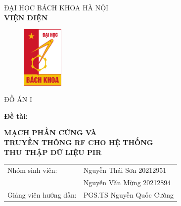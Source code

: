 \documentclass{article}
\begin{document}
\begin{titlepage}

\begin{center}
    \vspace{-10pt} ĐẠI HỌC BÁCH KHOA HÀ NỘI\\
    \textbf{\fontsize{16pt}{0pt}\selectfont VIỆN ĐIỆN}
    \vspace{0.5cm}
    \begin{figure}[H]
        \centering
        \includegraphics[width=2cm,height=3cm]{image/logo.png}
    \end{figure}


    \vspace{1cm}
    \fontsize{24pt}{0pt}\selectfont ĐỒ ÁN I\\
\end{center}
\hspace{15pt} \textbf{\fontsize{14pt}{0pt}\selectfont Đề tài:\\}
\begin{center}
    \textbf{\fontsize{20pt}{0pt}\selectfont MẠCH PHẦN CỨNG VÀ\\}
    \textbf{\fontsize{20pt}{0pt}\selectfont TRUYỀN THÔNG RF CHO HỆ THỐNG \\}
    \textbf{\fontsize{20pt}{0pt}\selectfont THU THẬP DỮ LIỆU PIR \\}
\end{center}
\vspace{1cm}
\begin{tabular}{l l}
    \hspace{15pt}
    \fontsize{14pt}{0pt}\selectfont Nhóm sinh viên: & \fontsize{20pt}{0pt}\selectfont Nguyễn Thái Sơn 20212951\\
    &\fontsize{20pt}{0pt}\selectfont Nguyễn Văn Mừng 20212894\\
    \hspace{15pt}
    \fontsize{14pt}{0pt}\selectfont Giảng viên hướng dẫn: & \fontsize{20pt}{0pt}\selectfont PGS.TS Nguyễn Quốc Cường  \\
   


\end{tabular}
\end{titlepage}
\end{document}
